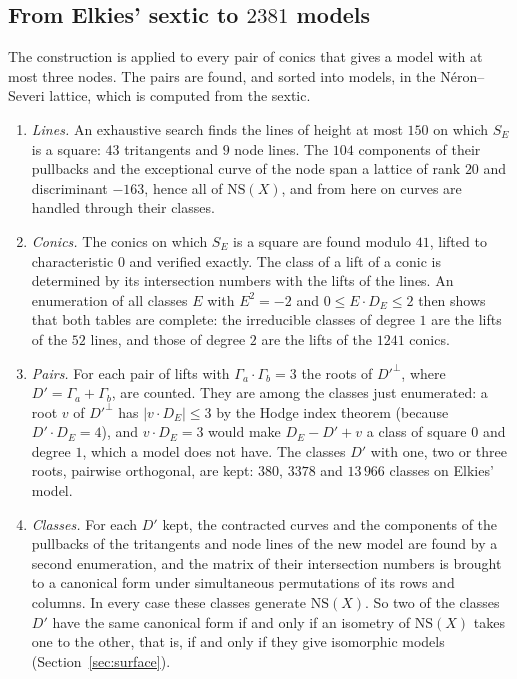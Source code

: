 \documentclass[11pt]{article}
\newcommand{\NS}{\mathrm{NS}}
\newcommand{\X}{X}
\theoremstyle{remark}
\begin{document}
\subsection*{From Elkies' sextic to $2381$ models}
The construction is applied to every pair of conics that gives a model with at most three nodes.  The pairs are found, and
sorted into models, in the N\'eron--Severi lattice, which is computed from the sextic.
\begin{enumerate}\itemsep 1pt
\item \emph{Lines.}  An exhaustive search finds the lines of height at most $150$ on which $S_E$ is a square: $43$ tritangents
and $9$ node lines.  The $104$ components of their pullbacks and the exceptional curve of the node span a lattice of rank $20$
and discriminant $-163$, hence all of $\NS(\X)$, and from here on curves are handled through their classes.
\item \emph{Conics.}  The conics on which $S_E$ is a square are found modulo $41$, lifted to characteristic $0$ and verified
exactly.  The class of a lift of a conic is determined by its intersection numbers with the lifts of the lines.  An enumeration of
all classes $E$ with $E^2=-2$ and $0\le E\cdot D_E\le 2$ then shows that both tables are complete: the irreducible classes of degree
$1$ are the lifts of the $52$ lines, and those of degree $2$ are the lifts of the $1241$ conics.
\item \emph{Pairs.}  For each pair of lifts with $\Gamma_a\cdot\Gamma_b=3$ the roots of $D'^\perp$, where $D'=\Gamma_a+\Gamma_b$, are
counted.  They are among the classes just enumerated: a root $v$ of $D'^\perp$ has $|v\cdot D_E|\le 3$ by the Hodge index theorem
(because $D'\cdot D_E=4$), and $v\cdot D_E=3$ would make $D_E-D'+v$ a class of square $0$ and degree $1$, which a model does not
have.  The classes $D'$ with one, two or three roots, pairwise orthogonal, are kept: $380$, $3378$ and $13\,966$ classes on Elkies'
model.
\item \emph{Classes.}  For each $D'$ kept, the contracted curves and the components of the pullbacks of the tritangents and node
lines of the new model are found by a second enumeration, and the matrix of their intersection numbers is brought to a canonical
form under simultaneous permutations of its rows and columns.  In every case these classes generate $\NS(\X)$.  So two of the
classes $D'$ have the same canonical form if and only if an isometry of $\NS(\X)$ takes one to the other, that is, if and only if
they give isomorphic models (Section~\ref{sec:surface}).

\end{enumerate}
\end{document}
